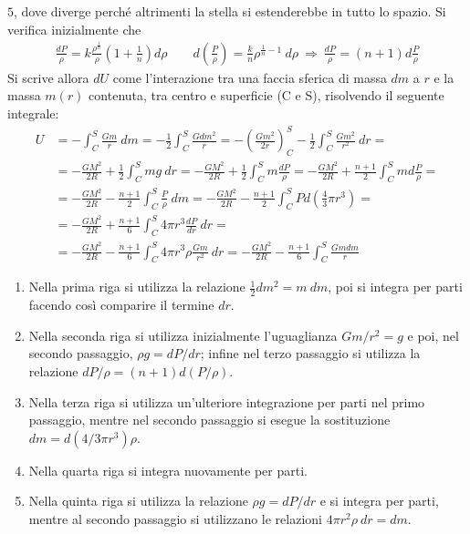 \documentclass[a4paper, oneside]{book}
\begin{document}
$5$, dove diverge perché altrimenti la stella si estenderebbe in tutto lo spazio. Si verifica inizialmente che 
\begin{gather*}
    \frac{dP}{\rho} = k\frac{\rho^{\frac{1}{n}}}{\rho} \left(1 + \frac{1}{n}\right) d\rho \qquad d\left(\frac{P}{\rho}\right) = \frac{k}{n}\rho^{\frac{1}{n} - 1} \ d\rho \ \Longrightarrow \ \frac{dP}{\rho} = (n + 1) d\frac{P}{\rho}
\end{gather*} 
Si scrive allora $dU$ come l'interazione tra una faccia sferica di massa $dm$ a $r$ e la massa
$m(r)$ contenuta, tra centro e superficie (C e S), risolvendo il seguente integrale:
\begin{align*}
    U &= - \int_{C}^{S} \frac{Gm}{r} \ dm = - \frac{1}{2}\int_{C}^{S} \frac{Gdm^{2}}{r} = - \left(\frac{Gm^{2}}{2r}\right)_{C}^{S} - \frac{1}{2}\int_{C}^{S}\frac{Gm^{2}}{r^{2}} \ dr = \\
    &= - \frac{GM^{2}}{2R} + \frac{1}{2}\int_{C}^{S} mg \ dr = - \frac{GM^{2}}{2R} + \frac{1}{2}\int_{C}^{S} m \frac{dP}{\rho} = - \frac{GM^{2}}{2R} + \frac{n + 1}{2} \int_{C}^{S} md\frac{P}{\rho} = \\
    &= - \frac{GM^{2}}{2R} - \frac{n + 1}{2}\int_{C}^{S}\frac{P}{\rho} \ dm = - \frac{GM^{2}}{2R} - \frac{n + 1}{2} \int_{C}^{S} P d\left(\frac{4}{3}\pi r^{3}\right) = \\
    &= - \frac{GM^{2}}{2R} + \frac{n + 1}{6} \int_{C}^{S} 4\pi r^{3} \frac{dP}{dr} \ dr = \\
    &= - \frac{GM^{2}}{2R} - \frac{n + 1}{6} \int_{C}^{S} 4\pi r^{3} \rho \frac{Gm}{r^{2}} \ dr = - \frac{GM^{2}}{2R} - \frac{n + 1}{6} \int_{C}^{S} \frac{Gmdm}{r}        
\end{align*}
\begin{enumerate}
    \item  Nella prima riga si utilizza la relazione $\frac{1}{2} dm^{2} = m\ dm$, poi si integra per parti facendo così comparire
    il termine $dr$.
    \item   Nella seconda riga si utilizza inizialmente 
l'uguaglianza $Gm/r^{2} = g$ e poi, nel secondo passaggio, $\rho g = dP / dr$; infine nel terzo passaggio 
si utilizza la relazione $dP/\rho = (n + 1)d (P/\rho)$.
    \item Nella terza riga si utilizza
un'ulteriore integrazione per parti nel primo passaggio, mentre nel secondo passaggio 
si esegue la sostituzione $dm = d(4/3\pi r^{3})\rho$.
    \item   Nella quarta riga si integra nuovamente per parti. 
    \item Nella quinta riga si utilizza la relazione $\rho g = dP / dr$ e si integra per parti, mentre al secondo 
passaggio si utilizzano le relazioni $4\pi r^{2}\rho \ dr = dm$.
\end{enumerate}
\end{document}
